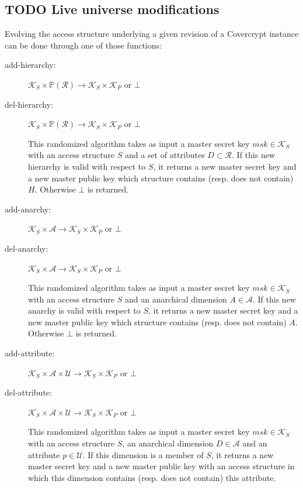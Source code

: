 \documentclass[a4paper]{article}
\theoremstyle{definition}
\newcommand{\powerset}[1]{\mathbb P(#1)}
\newcommand{\cA}{\mathcal{A}}
\newcommand{\cK}{\mathcal{K}}
\newcommand{\cR}{\mathcal{R}}
\newcommand{\cU}{\mathcal{U}}
\begin{document}
\subsection{{\bfseries\sffamily TODO} Live universe modifications}
\label{sec:org1d3d2bc}

Evolving  the access  structure  underlying  a given  revision  of a  Covercrypt
instance can be done through one of those functions:
\begin{description}
\item[{add-hierarchy:}] \(\cK_S \times \powerset{\cR} \rightarrow
  \cK_S \times \cK_P\) or \(\bot\)
\item[{del-hierarchy:}] \(\cK_S \times \powerset{\cR} \rightarrow
  \cK_S \times \cK_P\) or \(\bot\)

This randomized algorithm  takes as input a master secret  key \(msk \in \cK_S\)
with an access structure \(S\) and a  set of attributes \(D \subset \cR\). If this
new hierarchy is valid with respect to \(S\), it returns a new master secret key
and a new master public key which structure contains (resp.  does not contain)
\(H\). Otherwise \(\bot\) is returned.

\item[{add-anarchy:}] \(\cK_S \times \cA \rightarrow \cK_S
  \times \cK_P\) or \(\bot\)
\item[{del-anarchy:}] \(\cK_S \times \cA \rightarrow \cK_S
  \times \cK_P\) or \(\bot\)

This randomized algorithm  takes as input a master secret  key \(msk \in \cK_S\)
with an access structure \(S\) and an  anarchical dimension \(A \in \cA\). If this
new anarchy is valid  with respect to \(S\), it returns a  new master secret key
and a new master public key which structure contains (resp.  does not contain)
\(A\). Otherwise \(\bot\) is returned.

\item[{add-attribute:}] \(\cK_S \times \cA \times \cU
  \rightarrow \cK_S \times \cK_P\) or \(\bot\)
\item[{del-attribute:}] \(\cK_S \times \cA \times \cU
  \rightarrow \cK_S \times \cK_P\) or \(\bot\)

This randomized algorithm  takes as input a master secret  key \(msk \in \cK_S\)
with  an access  structure \(S\),  an anarchical  dimension \(D  \in \cA\)  and an
attribute \(p \in \cU\). If this dimension is  a member of \(S\), it returns a new
master secret  key and  a new master  public key with  an access  structure in
which this dimension contains (resp. does not contain) this attribute.


\end{description}
\end{document}
